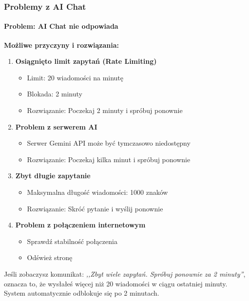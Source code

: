 \documentclass[12pt,a4paper]{article}
\begin{document}
\subsubsection{Problemy z AI Chat}

\paragraph{Problem: AI Chat nie odpowiada}

\textbf{Możliwe przyczyny i rozwiązania:}

\begin{enumerate}
    \item \textbf{Osiągnięto limit zapytań (Rate Limiting)}
    \begin{itemize}
        \item Limit: 20 wiadomości na minutę
        \item Blokada: 2 minuty
        \item Rozwiązanie: Poczekaj 2 minuty i spróbuj ponownie
    \end{itemize}
    
    \item \textbf{Problem z serwerem AI}
    \begin{itemize}
        \item Serwer Gemini API może być tymczasowo niedostępny
        \item Rozwiązanie: Poczekaj kilka minut i spróbuj ponownie
    \end{itemize}
    
    \item \textbf{Zbyt długie zapytanie}
    \begin{itemize}
        \item Maksymalna długość wiadomości: 1000 znaków
        \item Rozwiązanie: Skróć pytanie i wyślij ponownie
    \end{itemize}
    
    \item \textbf{Problem z połączeniem internetowym}
    \begin{itemize}
        \item Sprawdź stabilność połączenia
        \item Odśwież stronę
    \end{itemize}
\end{enumerate}

\begin{tcolorbox}[colback=yellow!10!white,colframe=orange!75!black,title=\faExclamationTriangle\ Rate Limiting]
Jeśli zobaczysz komunikat: \textit{,,Zbyt wiele zapytań. Spróbuj ponownie za 2 minuty''}, oznacza to, że wysłałeś więcej niż 20 wiadomości w ciągu ostatniej minuty. System automatycznie odblokuje się po 2 minutach.
\end{tcolorbox}
\end{document}
